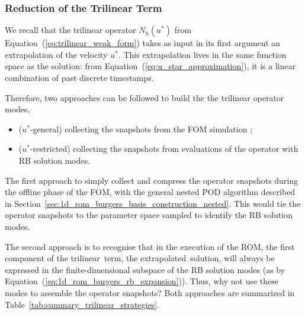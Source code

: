 \documentclass[../../thesis.tex]{subfiles}
\begin{document}
\newpage
\subsubsection{Reduction of the Trilinear Term}
We recall that the trilinear operator $N_h(u^{*})$ 
from Equation~(\ref{eq:trilinear_weak_form})
takes as input in its first argument an extrapolation of the velocity $u^{*}$.
This extrapolation lives in the same function space as the solution:
from Equation~(\ref{eq:u_star_approximation}),
it is a linear combination of past discrete timestamps.

Therefore, two approaches can be followed to build the the trilinear operator modes,
\begin{itemize}
    \item (\mbox{$u^{*}$-general}) collecting the snapshots from the FOM simulation \cite{Santo_Manzoni_2019};
    \item (\mbox{$u^{*}$-restricted}) collecting the snapshots from evaluations of the operator with RB solution modes.
\end{itemize}
The first approach to simply 
collect and compress the operator snapshots 
during the offline phase of the FOM,
with the general nested POD algorithm described 
in Section~\ref{sec:1d_rom_burgers_basis_construction_nested}.
This would tie the operator snapshots to the parameter space
sampled to identify the RB solution modes.

The second approach is to recognise that in the execution of the ROM,
the first component of the trilinear term, the extrapolated solution, 
will always be expressed in the finite-dimensional subspace of the RB solution modes
(as by Equation~(\ref{eq:1d_rom_burgers_rb_expansion})).
Thus, why not use these modes to assemble the operator snapshots?
Both approaches are summarized in Table~\ref{tab:summary_trilinear_strategies}.
\end{document}
